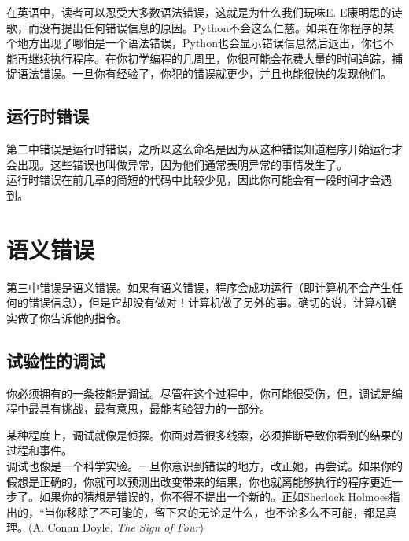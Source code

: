 \documentclass[10pt]{book}
\begin{document}
在英语中，读者可以忍受大多数语法错误，这就是为什么我们玩味E. E康明思的诗歌，而没有提出任何错误信息的原因。Python不会这么仁慈。如果在你程序的某个地方出现了哪怕是一个语法错误，Python也会显示错误信息然后退出，你也不能再继续执行程序。在你初学编程的几周里，你很可能会花费大量的时间追踪，捕捉语法错误。一旦你有经验了，你犯的错误就更少，并且也能很快的发现他们。

\subsection{运行时错误}
\label{runtime 运行时}


第二中错误是运行时错误，之所以这么命名是因为从这种错误知道程序开始运行才会出现。这些错误也叫做异常，因为他们通常表明异常的事情发生了。\\

运行时错误在前几章的简短的代码中比较少见，因此你可能会有一段时间才会遇到。

\section{语义错误}

第三中错误是语义错误。如果有语义错误，程序会成功运行（即计算机不会产生任何的错误信息），但是它却没有做对！计算机做了另外的事。确切的说，计算机确实做了你告诉他的指令。

\subsection{试验性的调试}

你必须拥有的一条技能是调试。尽管在这个过程中，你可能很受伤，但，调试是编程中最具有挑战，最有意思，最能考验智力的一部分。\\


某种程度上，调试就像是侦探。你面对着很多线索，必须推断导致你看到的结果的过程和事件。\\

调试也像是一个科学实验。一旦你意识到错误的地方，改正她，再尝试。如果你的假想是正确的，你就可以预测出改变带来的结果，你也就离能够执行的程序更近一步了。如果你的猜想是错误的，你不得不提出一个新的。正如Sherlock Holmoes指出的，“当你移除了不可能的，留下来的无论是什么，也不论多么不可能，都是真理。(A. Conan Doyle, {\em The Sign of Four})\\
\end{document}
